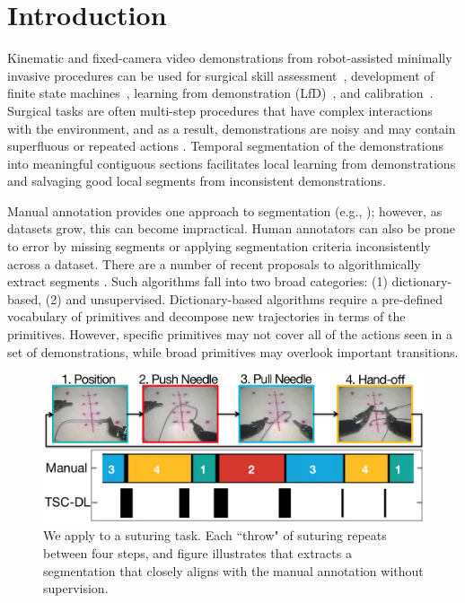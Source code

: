 \documentclass[0-main.tex]{subfiles}
\begin{document}
\section{Introduction}
Kinematic and fixed-camera video demonstrations from robot-assisted minimally invasive procedures can be used for surgical skill assessment~\cite{gao2014jigsaws}, development of finite state machines~\cite{kehoe2014autonomous,murali2015learning}, learning from demonstration (LfD)~\cite{reiley2010motion}, and calibration~\cite{mahler2014learning}.
Surgical tasks are often multi-step procedures that have complex interactions with the environment, and as a result, demonstrations are noisy and may contain superfluous or repeated actions \cite{krishnan2015tsc}.
Temporal segmentation of the demonstrations into meaningful contiguous sections facilitates local learning from demonstrations and salvaging good local segments from inconsistent demonstrations.

Manual annotation provides one approach to segmentation (e.g., \cite{hanlearning}); however, as datasets grow, this can become impractical.
Human annotators can also be prone to error by missing segments or applying segmentation criteria inconsistently across a dataset.
There are a number of recent proposals to algorithmically extract segments \cite{calinon2010learning, Niekum2015learning, krishnan2015tsc}.
Such algorithms fall into two broad categories: (1) dictionary-based, (2) and unsupervised.
Dictionary-based algorithms require a pre-defined vocabulary of primitives and decompose new trajectories in terms of the primitives.
However, specific primitives may not cover all of the actions seen in a set of demonstrations, while broad primitives may overlook important transitions.

\begin{figure}[t!]
\centering
\vspace{-5pt}
\includegraphics[width=\linewidth]{figures/suturing-teaser-v4.png}
\caption{We apply \tsc to a suturing task. Each ``throw" of suturing repeats between four steps, and figure illustrates that \tsc extracts a segmentation that closely aligns with the manual annotation without supervision.}
\vspace{-15pt} 
\end{figure}
\end{document}
